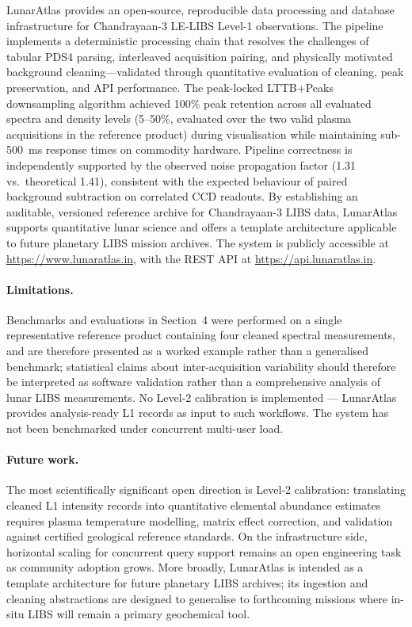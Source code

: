 \documentclass[final,5p,twocolumn,a4paper]{elsarticle}
\begin{document}
LunarAtlas provides an open-source, reproducible data processing and database infrastructure for Chandrayaan-3 LE-LIBS Level-1 observations. The pipeline implements a deterministic processing chain that resolves the challenges of tabular PDS4 parsing, interleaved acquisition pairing, and physically motivated background cleaning---validated through quantitative evaluation of cleaning, peak preservation, and API performance. The peak-locked LTTB+Peaks downsampling algorithm achieved 100\% peak retention across all evaluated spectra and density levels (5--50\%, evaluated over the two valid plasma acquisitions in the reference product) during visualisation while maintaining sub-500~ms response times on commodity hardware. Pipeline correctness is independently supported by the observed noise propagation factor (1.31 vs.\ theoretical 1.41), consistent with the expected behaviour of paired background subtraction on correlated CCD readouts. By establishing an auditable, versioned reference archive for Chandrayaan-3 LIBS data, LunarAtlas supports quantitative lunar science and offers a template architecture applicable to future planetary LIBS mission archives. The system is publicly accessible at \url{https://www.lunaratlas.in}, with the REST API at \url{https://api.lunaratlas.in}.

\paragraph{Limitations.} Benchmarks and evaluations in Section~4 were performed on a single representative reference product containing four cleaned spectral measurements, and are therefore presented as a worked example rather than a generalised benchmark; statistical claims about inter-acquisition variability should therefore be interpreted as software validation rather than a comprehensive analysis of lunar LIBS measurements. No Level-2 calibration is implemented --- LunarAtlas provides analysis-ready L1 records as input to such workflows. The system has not been benchmarked under concurrent multi-user load.

\paragraph{Future work.} The most scientifically significant open direction is Level-2 calibration: translating cleaned L1 intensity records into quantitative elemental abundance estimates requires plasma temperature modelling, matrix effect correction, and validation against certified geological reference standards. On the infrastructure side, horizontal scaling for concurrent query support remains an open engineering task as community adoption grows. More broadly, LunarAtlas is intended as a template architecture for future planetary LIBS archives; its ingestion and cleaning abstractions are designed to generalise to forthcoming missions where in-situ LIBS will remain a primary geochemical tool.
\end{document}
